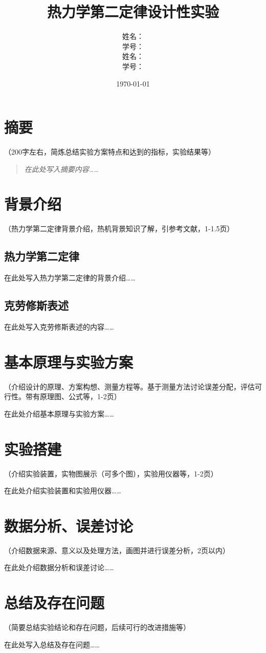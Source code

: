 \documentclass[12pt]{article}
\title{热力学第二定律设计性实验}
\author{
    姓名：\underline{\hspace{3cm}} \\
    学号：\underline{\hspace{3cm}} \\
    姓名：\underline{\hspace{3cm}} \\
    学号：\underline{\hspace{3cm}}
}
\date{\today}
\begin{document}
\maketitle

\section*{摘要}
（200字左右，简炼总结实验方案特点和达到的指标，实验结果等）

\begin{quote}
\textit{在此处写入摘要内容……}
\end{quote}

\section*{背景介绍}
（热力学第二定律背景介绍，热机背景知识了解，引参考文献，1-1.5页）

\subsection*{热力学第二定律}
在此处写入热力学第二定律的背景介绍……

\subsection*{克劳修斯表述}
在此处写入克劳修斯表述的内容……

\section*{基本原理与实验方案}
（介绍设计的原理、方案构想、测量方程等。基于测量方法讨论误差分配，评估可行性。带有原理图、公式等，1-2页）

在此处介绍基本原理与实验方案……

\section*{实验搭建}
（介绍实验装置，实物图展示（可多个图），实验用仪器等，1-2页）

在此处介绍实验装置和实验用仪器……


\section*{数据分析、误差讨论}
（介绍数据来源、意义以及处理方法，画图并进行误差分析，2页以内）

在此处介绍数据分析和误差讨论……

\section*{总结及存在问题}
（简要总结实验结论和存在问题，后续可行的改进措施等）

在此处写入总结及存在问题……


\end{document}
